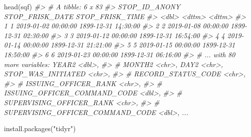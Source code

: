 \documentclass[
]{krantz}
\makeatletter
\newenvironment{Shaded}{\begin{snugshade}}{\end{snugshade}}
\newcommand{\CommentTok}[1]{\textcolor[rgb]{0.37,0.37,0.37}{\textit{#1}}}
\newcommand{\FunctionTok}[1]{\textcolor[rgb]{0,0,0}{#1}}
\newcommand{\NormalTok}[1]{#1}
\newcommand{\StringTok}[1]{\textcolor[rgb]{0.5,0.5,0.5}{#1}}
\newenvironment{kframe}{%
\medskip{}
\setlength{\fboxsep}{.8em}
 \def\at@end@of@kframe{}%
 \ifinner\ifhmode%
  \def\at@end@of@kframe{\end{minipage}}%
  \begin{minipage}{\columnwidth}%
 \fi\fi%
 \def\FrameCommand##1{\hskip\@totalleftmargin \hskip-\fboxsep
 \colorbox{shadecolor}{##1}\hskip-\fboxsep
     \hskip-\linewidth \hskip-\@totalleftmargin \hskip\columnwidth}%
 \MakeFramed {\advance\hsize-\width
   \@totalleftmargin\z@ \linewidth\hsize
   \@setminipage}}%
 {\par\unskip\endMakeFramed%
 \at@end@of@kframe}
\renewenvironment{Shaded}{\begin{kframe}}{\end{kframe}}
\makeatother
\begin{document}
\begin{Shaded}
\begin{Highlighting}[]
\FunctionTok{head}\NormalTok{(sqf)}
\CommentTok{\#\textgreater{} \# A tibble: 6 x 83}
\CommentTok{\#\textgreater{}   STOP\_ID\_ANONY STOP\_FRISK\_DATE     STOP\_FRISK\_TIME    }
\CommentTok{\#\textgreater{}           \textless{}dbl\textgreater{} \textless{}dttm\textgreater{}              \textless{}dttm\textgreater{}             }
\CommentTok{\#\textgreater{} 1             1 2019{-}01{-}02 00:00:00 1899{-}12{-}31 14:30:00}
\CommentTok{\#\textgreater{} 2             2 2019{-}01{-}08 00:00:00 1899{-}12{-}31 02:30:00}
\CommentTok{\#\textgreater{} 3             3 2019{-}01{-}12 00:00:00 1899{-}12{-}31 16:54:00}
\CommentTok{\#\textgreater{} 4             4 2019{-}01{-}14 00:00:00 1899{-}12{-}31 21:21:00}
\CommentTok{\#\textgreater{} 5             5 2019{-}01{-}15 00:00:00 1899{-}12{-}31 18:50:00}
\CommentTok{\#\textgreater{} 6             6 2019{-}01{-}23 00:00:00 1899{-}12{-}31 06:16:00}
\CommentTok{\#\textgreater{} \# ... with 80 more variables: YEAR2 \textless{}dbl\textgreater{},}
\CommentTok{\#\textgreater{} \#   MONTH2 \textless{}chr\textgreater{}, DAY2 \textless{}chr\textgreater{}, STOP\_WAS\_INITIATED \textless{}chr\textgreater{},}
\CommentTok{\#\textgreater{} \#   RECORD\_STATUS\_CODE \textless{}chr\textgreater{},}
\CommentTok{\#\textgreater{} \#   ISSUING\_OFFICER\_RANK \textless{}chr\textgreater{},}
\CommentTok{\#\textgreater{} \#   ISSUING\_OFFICER\_COMMAND\_CODE \textless{}dbl\textgreater{},}
\CommentTok{\#\textgreater{} \#   SUPERVISING\_OFFICER\_RANK \textless{}chr\textgreater{},}
\CommentTok{\#\textgreater{} \#   SUPERVISING\_OFFICER\_COMMAND\_CODE \textless{}dbl\textgreater{}, ...}
\end{Highlighting}
\end{Shaded}

\begin{Shaded}
\begin{Highlighting}[]
\FunctionTok{install.packages}\NormalTok{(}\StringTok{"tidyr"}\NormalTok{)}
\end{Highlighting}
\end{Shaded}
\end{document}
